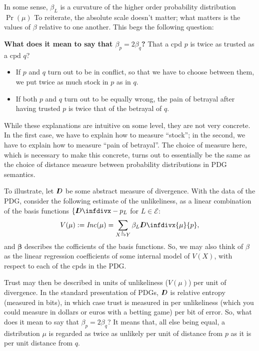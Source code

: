 \documentclass[twoside]{article} %
\theoremstyle{plain}
\theoremstyle{definition}
\newcommand{\thickD}{I\mkern-8muD}
\newcommand{\kldiv}{\thickD\infdivx}
\newcommand{\Ed}{\mathcal E}
\newcommand{\bbeta}{\boldsymbol\beta}
\newcommand\Inc{\mathit{Inc}}
\newcommand{\ed}[3]{#2%
    	  \overset{\smash{\mskip-5mu\raisebox{-1pt}{$\scriptscriptstyle
    	        #1$}}}{\rightarrow} #3}
\begin{document}
    In some sense, $\beta_L$ is a curvature of the higher order probability distribution $\Pr(\mu)$
    To reiterate, the absolute scale doesn't matter; what matters is the values of $\beta$ relative to one another. This begs the following question:
    
    
        
    \textbf{What does it mean to say that $\beta_p = 2 \beta_{q}$?}
    That a cpd $p$ is twice as trusted as a cpd $q$? 
        
    \begin{itemize}
        \item If $p$ and $q$ turn out to be in conflict, so that we have to choose between them, we put twice as much stock in $p$ as in $q$. 
        \item If both $p$ and $q$ turn out to be equally wrong, the pain of betrayal after having trusted $p$ is twice that of the betrayal of $q$.
    \end{itemize}
    
    While these explanations are intuitive on some level, they are not very concrete. 
    In the first case, we have to explain how to measure ``stock''; in the second, we have to explain how to measure ``pain of betrayal''.  The choice of measure here, which is necessary to make this concrete, turns out to essentially be the same as the choice of distance measure between probability distributions in PDG semantics.
    
    To illustrate, let $\thickD$ be some abstract measure of divergence. 
    With the data of the PDG, consider the following estimate of the unlikeliness, as a linear combination of the basis functions $\{ \kldiv-{p_L}$ for $L \in \Ed$: 
    \[
        V(\mu) := \Inc(\mu) = \sum_{\ed LXY} \beta_L \kldiv{\mu}{p},
    \]
    and $\bbeta$ describes the cofficients of the basis functions. 
    So, we may also think of $\beta$ as the linear regression coefficients of some internal model of $V(X)$, with respect to each of the cpds in the PDG. 
    
    Trust may then be described in units of unlikeliness ($V(\mu)$) per unit of divergence.  In the standard presentation of PDGs, $\thickD$ is relative entropy (measured in bits), in which case trust is measured in per unlikeliness (which you could measure in dollars or euros with a betting game) per bit of error.     
    So, what does it mean to say that $\beta_p = 2 \beta_{q}$? 
    It means that, all else being equal, a distribution $\mu$ is regarded as twice as unlikely per unit of distance from $p$ as it is per unit distance from $q$. 
    
\end{document}
